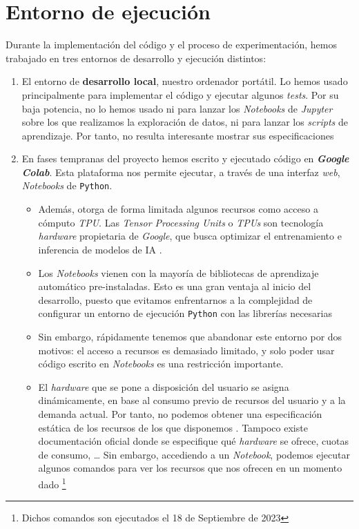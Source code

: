 \section{Entorno de ejecución}

Durante la implementación del código y el proceso de experimentación, hemos trabajado en tres entornos de desarrollo y ejecución distintos:

\begin{enumerate}
    \item El entorno de \textbf{desarrollo local}, nuestro ordenador portátil. Lo hemos usado principalmente para implementar el código y ejecutar algunos \textit{tests}. Por su baja potencia, no lo hemos usado ni para lanzar los \textit{Notebooks} de \textit{Jupyter} sobre los que realizamos la exploración de datos, ni para lanzar los \textit{scripts} de aprendizaje. Por tanto, no resulta interesante mostrar sus especificaciones

    \item En fases tempranas del proyecto hemos escrito y ejecutado código en \textbf{\textit{Google Colab}}. Esta plataforma nos permite ejecutar, a través de una interfaz \textit{web}, \textit{Notebooks} de \lstinline{Python}.

        \begin{itemize}
            \item Además, otorga de forma limitada algunos recursos como acceso a cómputo \textit{TPU}. Las \textit{Tensor Processing Units} o \textit{TPUs} son tecnología \textit{hardware} propietaria de \textit{Google}, que busca optimizar el entrenamiento e inferencia de modelos de IA \cite{informatica:google_tpu}.

            \item Los \textit{Notebooks} vienen con la mayoría de bibliotecas de aprendizaje automático pre-instaladas. Esto es una gran ventaja al inicio del desarrollo, puesto que evitamos enfrentarnos a la complejidad de configurar un entorno de ejecución \lstinline{Python} con las librerías necesarias

            \item Sin embargo, rápidamente tenemos que abandonar este entorno por dos motivos: el acceso a recursos es demasiado limitado, y solo poder usar código escrito en \textit{Notebooks} es una restricción importante.

            \item El \textit{hardware} que se pone a disposición del usuario se asigna dinámicamente, en base al consumo previo de recursos del usuario y a la demanda actual. Por tanto, no podemos obtener una especificación estática de los recursos de los que disponemos \cite{informatica:google_colab_faq}. Tampoco existe documentación oficial donde se especifique qué \textit{hardware} se ofrece, cuotas de consumo, \ldots\; Sin embargo, accediendo a un \textit{Notebook}, podemos ejecutar algunos comandos para ver los recursos que nos ofrecen en un momento dado \footnote{Dichos comandos son ejecutados el 18 de Septiembre de 2023}


\end{itemize}
\end{enumerate}

